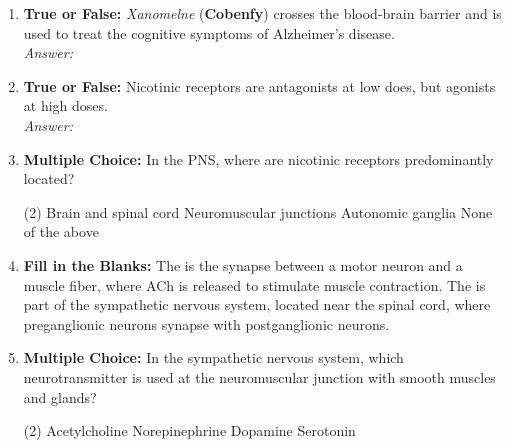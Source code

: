 \begin{enumerate}[label=\textbf{Q3.4.\arabic*}]
    \item \textbf{True or False:} \textit{Xanomelne} (\textbf{Cobenfy}) crosses the blood-brain barrier and is used to treat the cognitive symptoms of Alzheimer's disease. \\
        \textit{Answer:} %

    \item \textbf{True or False:} Nicotinic receptors are antagonists at low does, but agonists at high doses. \\
        \textit{Answer:} %

    \item \textbf{Multiple Choice:} In the PNS, where are nicotinic receptors predominantly located? 
            \begin{tasks}[label=\textcolor{\documentTheme}{(\Alph*)}, item-format=\color{\documentTheme}, label-width=1.5em, item-indent=1.7em](2)
                \task Brain and spinal cord
                \task Neuromuscular junctions
                \task Autonomic ganglia
                \task None of the above
            \end{tasks}

    \item \textbf{Fill in the Blanks:} The \underline{\hspace{3cm}} is the synapse between a motor neuron and a muscle fiber, where ACh is released to stimulate muscle contraction. The \underline{\hspace{3cm}} is part of the sympathetic nervous system, located near the spinal cord, where preganglionic neurons synapse with postganglionic neurons.

        \item \textbf{Multiple Choice:} In the sympathetic nervous system, which neurotransmitter is used at the neuromuscular junction with smooth muscles and glands?
        \begin{tasks}[label=\textcolor{\documentTheme}{(\Alph*)}, item-format=\color{\documentTheme}, label-width=1.5em, item-indent=1.7em](2)
            \task Acetylcholine
            \task Norepinephrine
            \task Dopamine
            \task Serotonin
        \end{tasks}


\end{enumerate}

